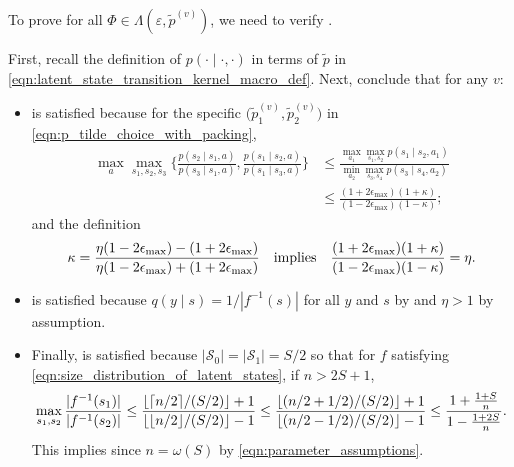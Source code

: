\documentclass[11pt]{article}
\newcommand{\mcS}{\mathcal{S}}
\DeclarePairedDelimiter\ceil{\lceil}{\rceil}
\DeclarePairedDelimiter\floor{\lfloor}{\rfloor}
\theoremstyle{definition}
\theoremstyle{definition}
\begin{document}
To prove  for all $\Phi\in \Lambda(\varepsilon, \tilde{p}^{(v)})$, we need to verify .

First, recall the definition of $p( \cdot \mid \cdot, \cdot )$ in terms of $\tilde{p}$ in \eqref{eqn:latent_state_transition_kernel_macro_def}.
Next, conclude that for any $v$:

\begin{itemize}

	\item
	       is satisfied because for the specific $\bigl(\tilde{p}^{(v)}_1, \tilde{p}^{(v)}_2\bigr)$ in \eqref{eqn:p_tilde_choice_with_packing},
	      \begin{align}
		      \max_{a}
		      \max_{s_1,s_2,s_3}
		      \biggl\{
		      \frac{p(s_2 \mid s_1,a)}{p(s_3 \mid s_1,a)}
		      ,
		      \frac{p(s_1 \mid s_2,a)}{p(s_1 \mid s_3,a)}
		      \biggr\}
		       &
		      \leq
		      \frac{\max_{a_1}\max_{s_1,s_2}p(s_1\mid s_2,a_1)}{\min_{a_2}\max_{s_3,s_4}p(s_3\mid s_4,a_2)}
		      \nonumber \\
		       &
		      \leq
		      \frac{(1+2\epsilon_{\max})(1+\kappa)}{(1-2\epsilon_{\max})(1-\kappa)}
		      ;
	      \end{align}
	      and the definition
	      \begin{equation}
		      \kappa
		      =
		      \frac{\eta(1-2\epsilon_{\max})-(1+2\epsilon_{\max})}{\eta(1-2\epsilon_{\max})+(1+2\epsilon_{\max})}
		      \quad
		      \textnormal{implies}
		      \quad
		      \frac{(1+2\epsilon_{\max})(1+\kappa)}{(1-2\epsilon_{\max})(1-\kappa)}
		      =
		      \eta
		      .
	      \end{equation}

	\item
	       is satisfied because $q(y \mid s) = 1/|f^{-1}(s)|$ for all $y$ and $s$ by  and $\eta>1$ by assumption.

	\item
	      Finally,  is satisfied because $|\mcS_0|=|\mcS_1|=S/2$ so that for $f$ satisfying \eqref{eqn:size_distribution_of_latent_states}, if $n >2S+1$,
	      \begin{equation}
		      \max_{s_1,s_2}
		      \frac{|f^{-1}(s_1)|}{|f^{-1}(s_2)|}
		      \leq
		      \frac{\floor{\ceil{n/2}/(S/2)}+1}{\floor{\floor{n/2}/(S/2)}-1}
		      \leq
		      \frac{\floor{(n/2+1/2)/(S/2)}+1}{\floor{(n/2-1/2)/(S/2)}-1}
		      \leq
		      \frac{1+\frac{1+S}{n}}{1-\frac{1+2S}{n}}
		      .
	      \end{equation}
	      This implies  since $n=\omega(S)$ by \eqref{eqn:parameter_assumptions}.
\end{itemize}
\end{document}
